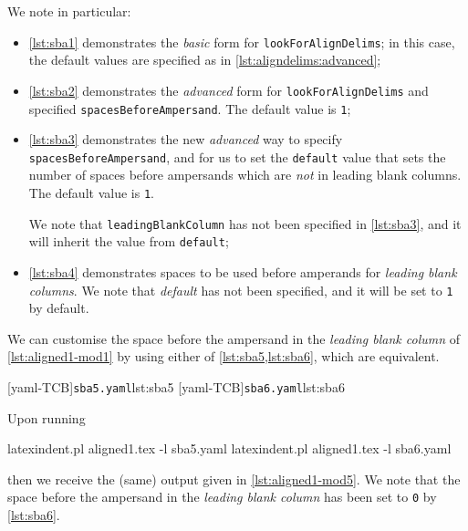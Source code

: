 	\begin{cmhtcbraster}
	\end{cmhtcbraster}

	We note in particular:
	\begin{itemize}
		\item \cref{lst:sba1} demonstrates the \emph{basic} form for
		      \texttt{lookForAlignDelims}; in this case,
		      the default values are specified as in \vref{lst:aligndelims:advanced};
		\item \cref{lst:sba2} demonstrates the \emph{advanced} form for
		      \texttt{lookForAlignDelims}
		      and specified \texttt{spacesBeforeAmpersand}. The default value is \texttt{1};
		\item \cref{lst:sba3} demonstrates the new \emph{advanced} way to specify
		      \texttt{spacesBeforeAmpersand}, and
		      for us to set the \texttt{default} value that sets the number of spaces before ampersands
		      which are \emph{not} in leading blank columns. The default value is \texttt{1}.

		      We note that \texttt{leadingBlankColumn} has not been specified in \cref{lst:sba3}, and
		      it will inherit the value from \texttt{default};
		\item \cref{lst:sba4} demonstrates spaces to be used before amperands for
		      \emph{leading blank columns}.
		      We note that \emph{default} has not been specified, and it will be set to \texttt{1} by
		      default.
	\end{itemize}
	We can customise the space before the ampersand in the \emph{leading blank column} of
	\cref{lst:aligned1-mod1} by using either of \cref{lst:sba5,lst:sba6}, which are
	equivalent.

	\begin{cmhtcbraster}
		[yaml-TCB]{\texttt{sba5.yaml}}{lst:sba5}
		[yaml-TCB]{\texttt{sba6.yaml}}{lst:sba6}
	\end{cmhtcbraster}

	Upon running
	\begin{commandshell}
latexindent.pl aligned1.tex -l sba5.yaml
latexindent.pl aligned1.tex -l sba6.yaml
\end{commandshell}
	then we receive the (same) output given in \cref{lst:aligned1-mod5}. We note that the
	space before the ampersand in the \emph{leading blank column} has been set to \texttt{0}
	by \cref{lst:sba6}.

